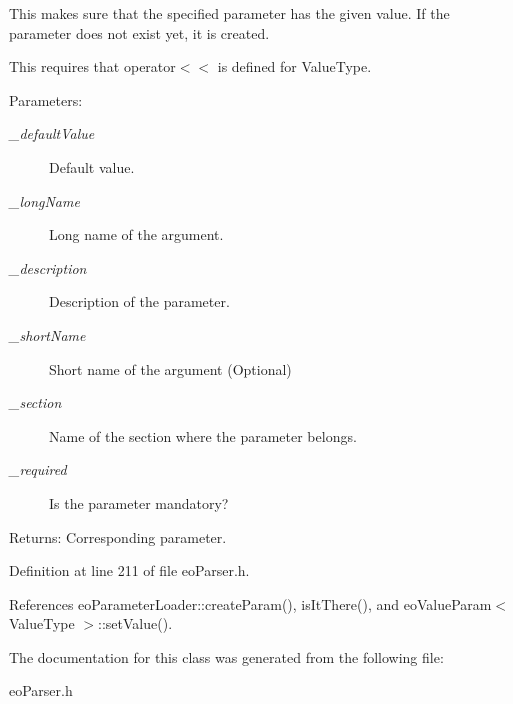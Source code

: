 This makes sure that the specified parameter has the given value. If the parameter does not exist yet, it is created.

This requires that operator$<$$<$ is defined for Value\-Type.

\begin{Desc}
\item[Parameters:]
\begin{description}
\item[{\em \_\-default\-Value}]Default value. \item[{\em \_\-long\-Name}]Long name of the argument. \item[{\em \_\-description}]Description of the parameter. \item[{\em \_\-short\-Name}]Short name of the argument (Optional) \item[{\em \_\-section}]Name of the section where the parameter belongs. \item[{\em \_\-required}]Is the parameter mandatory? \end{description}
\end{Desc}
\begin{Desc}
\item[Returns:]Corresponding parameter. \end{Desc}


Definition at line 211 of file eo\-Parser.h.

References eo\-Parameter\-Loader::create\-Param(), is\-It\-There(), and eo\-Value\-Param$<$ Value\-Type $>$::set\-Value().

The documentation for this class was generated from the following file:\begin{CompactItemize}
\item 
eo\-Parser.h\end{CompactItemize}
